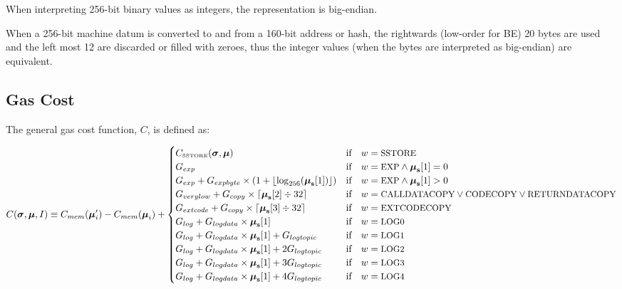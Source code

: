 \documentclass[9pt,oneside]{amsart}
\begin{document}
When interpreting 256-bit binary values as integers, the representation is big-endian.

When a 256-bit machine datum is converted to and from a 160-bit address or hash, the rightwards (low-order for BE) 20 bytes are used and the left most 12 are discarded or filled with zeroes, thus the integer values (when the bytes are interpreted as big-endian) are equivalent.

\subsection{Gas Cost}

The general gas cost function, $C$, is defined as:

\begin{equation}
C(\boldsymbol{\sigma}, \boldsymbol{\mu}, I) \equiv C_{mem}(\boldsymbol{\mu}'_i)-C_{mem}(\boldsymbol{\mu}_i) + \begin{cases}
C_\text{\tiny SSTORE}(\boldsymbol{\sigma}, \boldsymbol{\mu}) & \text{if} \quad w = \text{\small SSTORE} \\
G_{exp} & \text{if} \quad w = \text{\small EXP} \wedge \boldsymbol{\mu}_\mathbf{s}[1] = 0 \\
G_{exp} + G_{expbyte}\times(1+\lfloor\log_{256}(\boldsymbol{\mu}_\mathbf{s}[1])\rfloor) & \text{if} \quad w = \text{\small EXP} \wedge \boldsymbol{\mu}_\mathbf{s}[1] > 0 \\
G_{verylow} + G_{copy}\times\lceil\boldsymbol{\mu}_\mathbf{s}[2] \div 32\rceil & \text{if} \quad w = \text{\small CALLDATACOPY} \lor \text{\small CODECOPY} \lor \text{\small RETURNDATACOPY} \\
G_{extcode} + G_{copy}\times\lceil\boldsymbol{\mu}_\mathbf{s}[3] \div 32\rceil & \text{if} \quad w = \text{\small EXTCODECOPY} \\
G_{log}+G_{logdata}\times\boldsymbol{\mu}_\mathbf{s}[1] & \text{if} \quad w = \text{\small LOG0} \\
G_{log}+G_{logdata}\times\boldsymbol{\mu}_\mathbf{s}[1]+G_{logtopic} & \text{if} \quad w = \text{\small LOG1} \\
G_{log}+G_{logdata}\times\boldsymbol{\mu}_\mathbf{s}[1]+2G_{logtopic} & \text{if} \quad w = \text{\small LOG2} \\
G_{log}+G_{logdata}\times\boldsymbol{\mu}_\mathbf{s}[1]+3G_{logtopic} & \text{if} \quad w = \text{\small LOG3} \\
G_{log}+G_{logdata}\times\boldsymbol{\mu}_\mathbf{s}[1]+4G_{logtopic} & \text{if} \quad w = \text{\small LOG4} \\

\end{cases}
\end{equation}
\end{document}
